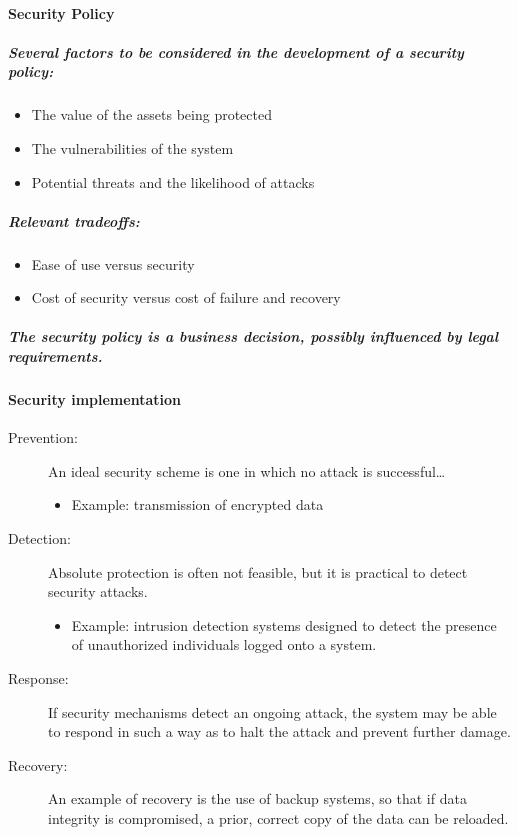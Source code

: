 \documentclass{article}
\begin{document}
                      \paragraph{Security Policy}
                        \subparagraph{Several factors to be considered in the development of a security policy:}
                            \begin{itemize}
                                \item The value of the assets being protected
                                \item The vulnerabilities of the system
                                \item Potential threats and the likelihood of attacks
                            \end{itemize}
                        \subparagraph{Relevant tradeoffs:}
                          \begin{itemize}
                              \item Ease of use versus security
                              \item Cost of security versus cost of failure and recovery
                          \end{itemize}
                        \subparagraph{The security policy is a business decision, possibly influenced by legal requirements.}
                    \paragraph{Security implementation}
                    \begin{description}
                        \item[Prevention:] An ideal security scheme is one in which no attack is successful…
                        \begin{itemize}
                            \item Example: transmission of encrypted data
                        \end{itemize}
                        
                        \item[Detection:] Absolute protection is often not feasible, but it is practical to detect security attacks.
                        \begin{itemize}
                            \item Example: intrusion detection systems designed to detect the presence of unauthorized individuals logged onto a system.
                        \end{itemize}
                        
                        \item[Response:] If security mechanisms detect an ongoing attack, the system may be able to respond in such a way as to halt the attack and prevent further damage.
                        
                        \item[Recovery:] An example of recovery is the use of backup systems, so that if data integrity is compromised, a prior, correct copy of the data can be reloaded.
                    \end{description}
\end{document}
